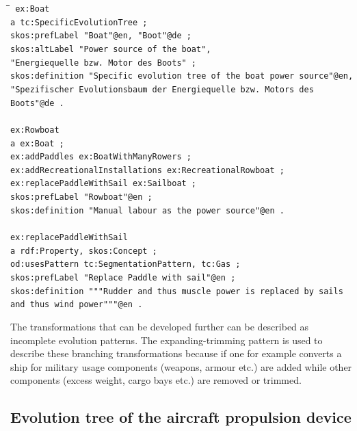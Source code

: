 \documentclass[11pt,a4paper]{article}
\newenvironment{code}{\tt \begin{tabbing}
\hskip12pt\=\hskip12pt\=\hskip12pt\=\hskip12pt\=\hskip5cm\=\hskip5cm\=\kill}
{\end{tabbing}}
\begin{document}
\begin{code}\tt
ex:Boat \\
\> a tc:SpecificEvolutionTree ; \\
\> skos:prefLabel "Boat"@en, "Boot"@de ; \\
\> skos:altLabel "Power source of the boat", \\
\>\> "Energiequelle bzw. Motor des Boots" ; \\
\> skos:definition "Specific evolution tree of the boat power source"@en, \\
\>\> "Spezifischer Evolutionsbaum der Energiequelle bzw. Motors des Boots"@de . \\
\\
ex:Rowboat \\
\> a ex:Boat ; \\ 
\> ex:addPaddles ex:BoatWithManyRowers ; \\
\> ex:addRecreationalInstallations ex:RecreationalRowboat ; \\
\> ex:replacePaddleWithSail ex:Sailboat ; \\
\> skos:prefLabel "Rowboat"@en ; \\
\> skos:definition "Manual labour as the power source"@en . \\
\\
ex:replacePaddleWithSail \\
\> a rdf:Property, skos:Concept ; \\
\> od:usesPattern tc:SegmentationPattern, tc:Gas ; \\
\> skos:prefLabel "Replace Paddle with sail"@en ; \\
\> skos:definition """Rudder and thus muscle power is replaced by sails \\
\>\> and thus wind power"""@en .
    
\end{code}


The transformations that can be developed further can be described as incomplete evolution patterns. The expanding-trimming pattern is used to describe these branching transformations because if one for example converts a ship for military usage components (weapons, armour etc.) are added while other components (excess weight, cargo bays etc.) are removed or trimmed.

\subsection{Evolution tree of the aircraft propulsion device}
\end{document}
